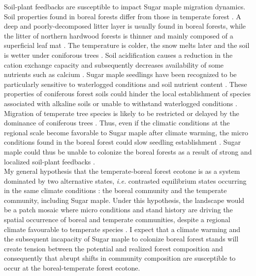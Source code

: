 Soil-plant feedbacks are susceptible to impact Sugar maple migration dynamics.
Soil
properties found in boreal forests differ from those in temperate
forest \cite{Lafleur2010,Barras1998,Goldblum2010,Demers1998}. A deep and
poorly-decomposed litter layer is usually found in boreal forests, while the
litter of  northern hardwood forests is thinner and mainly composed of a
superficial leaf mat \cite{Barras1998}. The temperature is colder, the snow
melts later and the soil is wetter under coniforous trees
\cite{Lafleur2010,Goldblum2010}. Soil acidification causes a reduction in the
cation exchange capacity and subsequently decreases availability of some
nutrients such as calcium \cite{Moore2008}. Sugar maple seedlings have been
recognized to be particularly sensitive to waterlogged conditions and soil
nutrient content \cite{Moore2008,Lafleur2010,Cleavitt2011}. These properties
of coniferous forest soils could hinder the local establishment of species
associated with alkaline soils or unable to withstand waterlogged conditions
\cite{Lafleur2010}. Migration of temperate tree species is likely
to be restricted or delayed by the dominance of coniferous trees \cite{Lafleur2010}. Thus, even if the climatic
conditions at the regional scale become favorable to Sugar maple after climate
warming, the micro conditions found in the boreal forest could slow seedling
establishment \cite{Kellman2004,Moore2008,Barras1998,Messier2011}. Sugar maple
could thus be unable to colonize the boreal forests as a result of strong and
localized soil-plant feedbacks \cite{McCarthyNeumann2012}.\\

My general hypothesis that the temperate-boreal forest ecotone is as a system
dominated by two alternative states, \textit{i.e.} contrasted equilibrium states occurring
in the same climate conditions \cite{scheffer2009critical}: the boreal
community and the temperate community, including Sugar maple. Under this hypothesis, the landscape would be
a patch mosaic where micro conditions and stand history are driving the spatial
occurrence of boreal and temperate communities, despite a regional climate
favourable to temperate species \cite{Goldblum2010,Fisichelli2013}. I expect
that a climate warming and the subsequent incapacity of Sugar maple to
colonize boreal forest stands will create  tension between the potential and
realized forest composition and consequently that abrupt shifts in community
composition are susceptible to occur at the boreal-temperate forest ecotone.\\

